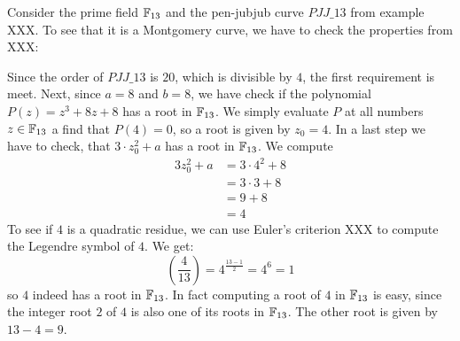 \begin{example}Consider the prime field $\mathbb{F}_{13}$ and the pen-jubjub curve $\mathit{PJJ\_13}$ from example XXX. To see that it is a Montgomery curve, we have to check the properties from XXX: 

Since the order  of $\mathit{PJJ\_13}$ is $20$, which is divisible by $4$, the first requirement is meet. Next, since $a=8$ and $b=8$, we have check if the polynomial $P(z) = z^3 + 8z + 8$ has a root in $\mathbb{F}_{13}$. We simply evaluate $P$ at all numbers $z\in \mathbb{F}_{13}$ a find that $P(4)=0$, so a root is given by $z_0=4$. In a last step we have to check, that $3\cdot z_0^2 + a$ has a root in $\mathbb{F}_{13}$. We compute
\begin{align*}
3z_0^2 + a & = 3\cdot 4^2 + 8 \\
           & = 3 \cdot 3 + 8 \\
           & = 9 + 8 \\
           & = 4
\end{align*}
To see if $4$ is a quadratic residue, we can use Euler's criterion XXX to compute the Legendre symbol of $4$. We get:
$$
\left(\frac{4}{13}\right) = 4^{\frac{13-1}{2}} = 4^6 = 1
$$ 
so $4$ indeed has a root in $\mathbb{F}_{13}$. In fact computing a root of $4$ in $\mathbb{F}_{13}$ is easy, since the integer root $2$ of $4$ is also one of its roots in $\mathbb{F}_{13}$. The other root is given by $13-4=9$.


\end{example}
